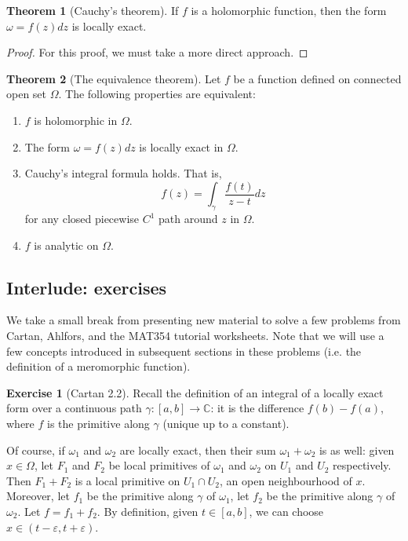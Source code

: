 \documentclass[aps,pra,showpacs,notitlepage,onecolumn,superscriptaddress,nofootinbib]{revtex4-1}
\theoremstyle{definition}
\newtheorem{theorem}{Theorem}[section]
\newtheorem{exercise}{Exercise}[section]
\newcommand{\hhrulefill}{\hspace{-1.5em} \hrulefill}
\begin{document}
\begin{theorem}[Cauchy's theorem]
  If $f$ is a holomorphic function, then the form $\omega = f(z) dz$ is locally exact.
\end{theorem}
\begin{proof}
  For this proof, we must take a more direct approach.
\end{proof}

\begin{theorem}[The equivalence theorem]
  Let $f$ be a function defined on connected open set $\Omega$. The following properties are equivalent:
  \begin{enumerate}
  \item $f$ is holomorphic in $\Omega$.
  \item The form $\omega = f(z) dz$ is locally exact in $\Omega$.
  \item Cauchy's integral formula holds. That is,
    \begin{equation}
      f(z) = \displaystyle\int_{\gamma} \frac{f(t)}{z - t} dz
    \end{equation}
    for any closed piecewise $C^1$ path around $z$ in $\Omega$.
    \item $f$ is analytic on $\Omega$.
    \end{enumerate}
\end{theorem}

\subsection{Interlude: exercises}

\noindent We take a small break from presenting new material to solve a few problems from Cartan, Ahlfors, and the MAT354 tutorial worksheets. Note that we will use a few concepts
introduced in subsequent sections in these problems (i.e. the definition of a meromorphic function).

\hhrulefill

\begin{exercise}[Cartan 2.2]
  Recall the definition of an integral of a locally exact form over a continuous path $\gamma : [a, b] \rightarrow \mathbb{C}$: it is the difference $f(b) - f(a)$, where
  $f$ is the primitive along $\gamma$ (unique up to a constant).
  \newline

  \noindent Of course, if $\omega_1$ and $\omega_2$ are locally exact, then their sum $\omega_1 + \omega_2$ is as well: given $x \in \Omega$, let $F_1$ and $F_2$ be local primitives
  of $\omega_1$ and $\omega_2$ on $U_1$ and $U_2$ respectively. Then $F_1 + F_2$ is a local primitive on $U_1 \cap U_2$, an open neighbourhood of $x$. Moreover, let $f_1$
  be the primitive along $\gamma$ of $\omega_1$, let $f_2$ be the primitive along $\gamma$ of $\omega_2$. Let $f = f_1 + f_2$. By definition, given $t \in [a, b]$, we can
  choose $x \in (t - \varepsilon, t + \varepsilon)$.
\end{exercise}
\end{document}
